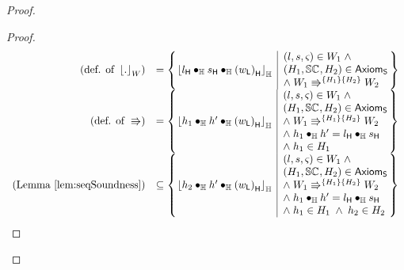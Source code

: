 \begin{lemma}
\begin{proof}
\begin{proof}
\[\begin{array}{r l}
	
	\left(\text{def. of } \reifyW{.}	\right)
	& =
	\left\{
	\hspace*{-0.15cm}
	\begin{array}{l | l}
		\reifyH{\heapPart{l} \composeH \heapPart{s} \composeH \heapPart{\left(\localPart{w}\right)}}
		&
		\hspace*{-0.15cm}
		\begin{array}{l}
			(l, s, \amod{}) \in W_1 \;\land\\ 
			(H_1, \seq{}, H_2) \in \AxiomsSeq \\
			\land\;\repartitions{W_1}{W_2}{H_1}{H_2}
		\end{array}			
		\hspace*{-0.15cm}
	\end{array}
	\hspace*{-0.15cm}
	\right\}\\
	
	
	\left(\text{def. of } \Rrightarrow	\right)
	& =
	\left\{
	\hspace*{-0.15cm}
	\begin{array}{l | l}
		\reifyH{h_1 \composeH h' \composeH \heapPart{\left(\localPart{w}\right)}}
		&
		\hspace*{-0.15cm}
		\begin{array}{l}
			(l, s, \amod{}) \in W_1 \;\land\\ 
			(H_1, \seq{}, H_2) \in \AxiomsSeq \\
			\land\;\repartitions{W_1}{W_2}{H_1}{H_2}\\
			\land\; h_1 \composeH h' = \heapPart{l} \composeH \heapPart{s}\\
			\land\; h_1 \in H_1
		\end{array}			
		\hspace*{-0.15cm}
	\end{array}
	\hspace*{-0.15cm}
	\right\}\\
	
	
	\left(\text{Lemma } \ref{lem:seqSoundness} \right)
	& \subseteq
	\left\{
	\hspace*{-0.15cm}
	\begin{array}{l | l}
		\reifyH{h_2 \composeH h' \composeH \heapPart{\left(\localPart{w}\right)}}
		&
		\hspace*{-0.15cm}
		\begin{array}{l}
			(l, s, \amod{}) \in W_1 \;\land\\ 
			(H_1, \seq{}, H_2) \in \AxiomsSeq \\
			\land\;\repartitions{W_1}{W_2}{H_1}{H_2}\\
			\land\; h_1 \composeH h' = \heapPart{l} \composeH \heapPart{s}\\
			\land\; h_1 \in H_1 \;\land\; h_2 \in H_2
		\end{array}			
		\hspace*{-0.15cm}
	\end{array}
	\hspace*{-0.15cm}
	\right\}\\
	

\end{array}\]
\end{proof}
\end{proof}
\end{lemma}
